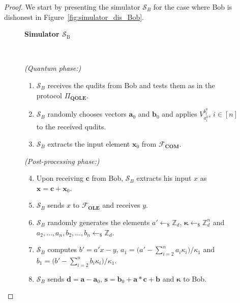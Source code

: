 \begin{proof}
We start by presenting the simulator $\mathcal{S}_B$ for the case where Bob is dishonest in Figure~\ref{fig:simulator_dis_Bob}.

\begin{figure}[h!]
    \centering
        \begin{tcolorbox}
            
            \centerline{\textbf{Simulator $\mathcal{S}_{\text{B}}$}}
            
            \

    \textit{(Quantum phase:)}
    
    \begin{enumerate}
        \item $\mathcal{S}_B$ receives the qudits from Bob and tests them as in the protocol $\Pi_{\textbf{QOLE}}$.
        \item $\mathcal{S}_B$ randomly chooses vectors $\bm{a}_0$ and $\bm{b}_0$ and applies  $V^{b^0_i}_{a^0_i}$, $i\in [n]$ to the received qudits.
        \item $\mathcal{S}_B$ extracts the input element $\bm{x}_0$  from  $\mathcal{F}_{\textbf{COM}}$.
    \end{enumerate}
    
    \textit{(Post-processing phase:)}
     
    \begin{enumerate}
    \setcounter{enumi}{3} 
        \item Upon receiving $\bm{c}$ from Bob, $\mathcal{S}_B$ extracts his input $x$ as  $\bm{x}=\bm{c} + \bm{x}_0$.
        \item $\mathcal{S}_B$ sends $x$ to  $\mathcal{F}_{\textbf{OLE}}$ and receives $y$.
        \item $\mathcal{S}_B$ randomly generates the elements $a'\leftarrow_{\$} \mathbb{Z}_d$, $\bm{\kappa}\leftarrow_{\$} \mathbb{Z}^n_d$ and $a_2, \ldots, a_n, b_2, \ldots, b_n\leftarrow_{\$}\mathbb{Z}_d$. 
        \item $\mathcal{S}_B$ computes $b' = a'x - y$, $a_1 = \big(a' - \sum_{i=2}^{n} a_i \kappa_i\big)/\kappa_1$ and $b_1 = \big(b' - \sum_{i=2}^{n} b_i \kappa_i\big)/\kappa_1$.
        \item  $\mathcal{S}_B$ sends $\bm{d} = \bm{a} - \bm{a}_0$, $\bm{s} = \bm{b}_0 + \bm{a} * \bm{c} + \bm{b}$ and $\bm{\kappa}$ to Bob.
        
        
    \end{enumerate} 
        

\end{tcolorbox}
\end{figure}
\end{proof}

